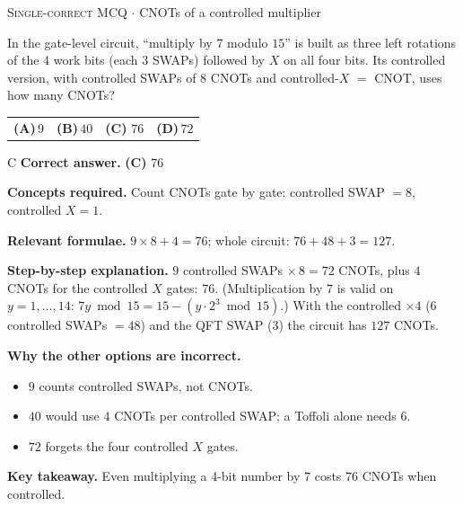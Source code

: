 \documentclass[11pt,a4paper]{article}
\newcommand{\optlabel}[1]{\textbf{(#1)}}
\newcommand{\correctlabel}[1]{\textcolor{okgreen}{\textbf{(#1)}\,\ding{51}}}
\newenvironment{qitem}[1]{\begin{list}{}{\setlength{\leftmargin}{3.3em}\setlength{\labelwidth}{3.1em}%
  \setlength{\labelsep}{0.2em}\setlength{\topsep}{3pt}\setlength{\parsep}{3pt}}\item[\textbf{Q.#1}\hfill]}{\end{list}}
\newcommand{\qsep}{\par\vspace{2pt}{\color{black!15}\hrule}\vspace{4pt}}
\newcommand{\qmeta}[2]{{\footnotesize\color{black!60}\textsc{#1} \;$\cdot$\; #2}\par}
\begin{document}
\begin{qitem}{69}
\qmeta{Single-correct MCQ}{CNOTs of a controlled multiplier}
In the gate-level circuit, ``multiply by $7$ modulo $15$'' is built as three left rotations of the 4 work bits (each $3$ SWAPs) followed by $X$ on all
four bits. Its controlled version, with controlled SWAPs of $8$ CNOTs and controlled-$X$ $=$ CNOT, uses how many CNOTs?
\par\smallskip\noindent\begin{tabularx}{\linewidth}{@{}*{4}{L}@{}}
\optlabel{A}\,$9$ & \optlabel{B}\,$40$ & \correctlabel{C}\,$76$ & \optlabel{D}\,$72$
\end{tabularx}
\end{qitem}
\begin{solbox}{C}
\textbf{\color{brand}Correct answer.} \textcolor{okgreen}{\textbf{(C)}} $76$

\textbf{\color{brand}Concepts required.} Count CNOTs gate by gate: controlled SWAP $= 8$, controlled $X = 1$.

\textbf{\color{brand}Relevant formulae.} $9\times8 + 4 = 76$; whole circuit: $76 + 48 + 3 = 127$.

\textbf{\color{brand}Step-by-step explanation.} $9$ controlled SWAPs $\times\,8 = 72$ CNOTs, plus $4$ CNOTs for the controlled $X$ gates: $76$. (Multiplication by $7$ is valid on $y = 1, \dots, 14$:
$7y \bmod 15 = 15 - (y\cdot2^3 \bmod 15)$.) With the controlled $\times4$ ($6$ controlled SWAPs $= 48$) and the QFT SWAP ($3$) the circuit has $127$ CNOTs.

\textbf{\color{brand}Why the other options are incorrect.}
\begin{itemize}[leftmargin=2.4em, itemsep=1pt, topsep=2pt]
\item[\textbf{(A)}] $9$ counts controlled SWAPs, not CNOTs.
\item[\textbf{(B)}] $40$ would use $4$ CNOTs per controlled SWAP; a Toffoli alone needs $6$.
\item[\textbf{(D)}] $72$ forgets the four controlled $X$ gates.
\end{itemize}
\textbf{\color{brand}Key takeaway.} Even multiplying a 4-bit number by $7$ costs $76$ CNOTs when controlled.
\end{solbox}
\qsep
\end{document}
